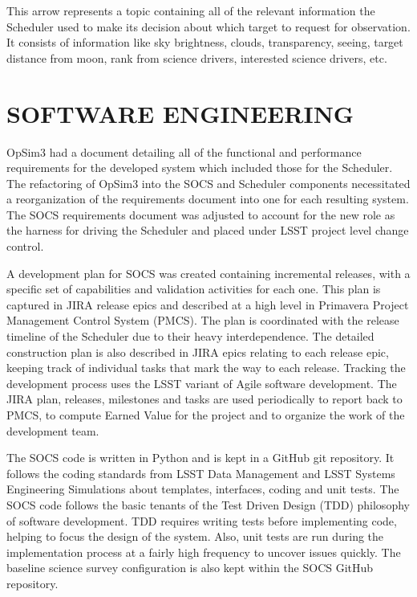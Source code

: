\documentclass[]{spie}  %
\begin{document}
This arrow represents a topic containing all of the relevant information the Scheduler used to make its decision about which target to request for observation. It consists of information like sky brightness, clouds, transparency, seeing, target distance from moon, rank from science drivers, interested science drivers, etc. 

\section{SOFTWARE ENGINEERING}

OpSim3 had a document detailing all of the functional and performance requirements for the developed system which included those for the Scheduler. The refactoring of OpSim3 into the SOCS and Scheduler components necessitated a reorganization of the requirements document into one for each resulting system. The SOCS requirements document was adjusted to account for the new role as the harness for driving the Scheduler and placed under LSST project level change control.

A development plan for SOCS was created containing incremental releases, with a specific set of capabilities and validation activities for each one. This plan is captured in JIRA\cite{JIRA} release epics and described at a high level in Primavera\cite{Primavera} Project Management Control System (PMCS)\cite{PMCS}. The plan is coordinated with the release timeline of the Scheduler due to their heavy interdependence. The detailed construction plan is also described in JIRA epics relating to each release epic, keeping track of individual tasks that mark the way to each release. Tracking the development process uses the LSST variant of Agile software development\cite{Kantor_SPIE2016}. The JIRA plan, releases, milestones and tasks are used periodically to report back to PMCS, to compute Earned Value\cite{Kantor_SPIE2016} for the project and to organize the work of the development team.

The SOCS code is written in Python\cite{Python} and is kept in a GitHub\cite{GitHub} git repository. It follows the coding standards\cite{DMPythonStyle} from LSST Data Management and LSST Systems Engineering Simulations about templates, interfaces, coding and unit tests. The SOCS code follows the basic tenants of the Test Driven Design\cite{Beck2002,Astels2003} (TDD) philosophy of software development. TDD requires writing tests before implementing code, helping to focus the design of the system. Also, unit tests are run during the implementation process at a fairly high frequency to uncover issues quickly. The baseline science survey configuration is also kept within the SOCS GitHub repository.
\end{document}
